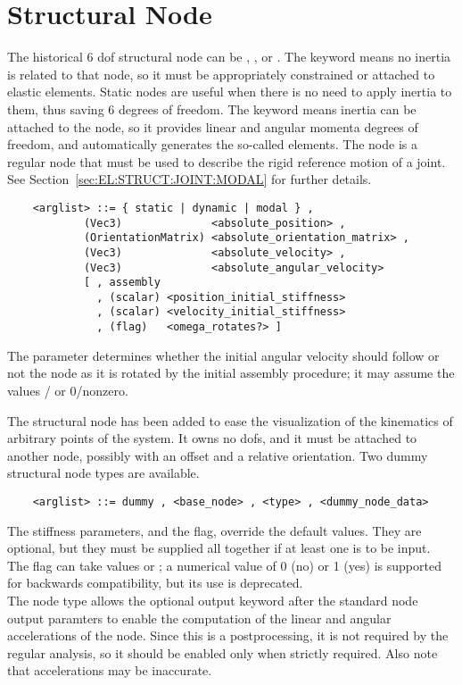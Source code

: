 \section{Structural Node}\label{sec:NODE:STRUCTURAL}
The historical 6 dof structural node can be ,
,  or .
The  keyword means no inertia is related to that node, 
so it must be appropriately constrained or attached to elastic elements.
Static nodes are useful when there is no need to apply inertia
to them, thus saving 6 degrees of freedom.
The  keyword means inertia can be attached to the node, 
so it provides linear and angular momenta degrees of freedom, 
and automatically generates the so-called 
elements.
The  node is a regular  node that must be used 
to describe the rigid reference motion of a  joint.
See Section~\ref{sec:EL:STRUCT:JOINT:MODAL} for further details.
\begin{verbatim}
    <arglist> ::= { static | dynamic | modal } ,
            (Vec3)              <absolute_position> ,
            (OrientationMatrix) <absolute_orientation_matrix> ,
            (Vec3)              <absolute_velocity> ,
            (Vec3)              <absolute_angular_velocity>
            [ , assembly
              , (scalar) <position_initial_stiffness>
              , (scalar) <velocity_initial_stiffness>
              , (flag)   <omega_rotates?> ]
\end{verbatim}
The  parameter determines whether 
the initial angular velocity should follow or not the node 
as it is rotated by the initial assembly procedure; it may assume 
the values / or 0/nonzero.

\noindent
The  structural node has been added to ease the visualization of
the kinematics of arbitrary points of the system. 
It owns no dofs, and it must be attached to another node, possibly with an
offset and a relative orientation.
Two dummy structural node types are available.
\begin{verbatim}
    <arglist> ::= dummy , <base_node> , <type> , <dummy_node_data>
\end{verbatim}
The stiffness parameters, and the  flag, 
override the default values. 
They are optional, but they must be supplied all together if at least
one is to be input. \\
The  flag can take values  or ;
a numerical value of 0 (no) or 1 (yes) is supported for backwards
compatibility, but its use is deprecated. \\
The  node type allows the optional output keyword
 after the standard node output paramters
to enable the computation of the linear and angular accelerations
of the node.  Since this is a postprocessing, it is not required
by the regular analysis, so it should be enabled only when strictly
required.  Also note that accelerations may be inaccurate.

